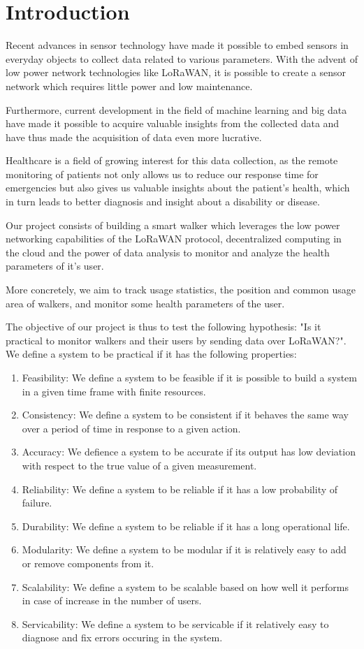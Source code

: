 \chapter{Introduction}
\label{cha:introduction}

Recent advances in sensor technology have made it possible to embed sensors in everyday objects to collect data related to various parameters. With the advent of low power network technologies like LoRaWAN, it is possible to create a sensor network which requires little power and low maintenance.

Furthermore, current development in the field of machine learning and big data have made it possible to acquire valuable insights from the collected data and have thus made the acquisition of data even more lucrative.

Healthcare is a field of growing interest for this data collection, as the remote monitoring of patients not only allows us to reduce our response time for emergencies but also gives us valuable insights about the patient's health, which in turn leads to better diagnosis and insight about a disability or disease.

Our project consists of building a smart walker which leverages the low power networking capabilities of the LoRaWAN protocol, decentralized computing in the cloud and the power of data analysis to monitor and analyze the health parameters of it's user.

More concretely, we aim to track usage statistics, the position and common usage area of walkers, and monitor some health parameters of the user.

The objective of our project is thus to test the following hypothesis:
"Is it practical to monitor walkers and their users by sending data over LoRaWAN?". We define a system to be practical if it has the following properties:

\begin{enumerate}
	\item Feasibility: We define a system to be feasible if it is possible to build a system in a given time frame with finite resources.
	\item Consistency: We define a system to be consistent if it behaves the same way over a period of time in response to a given action.
	\item Accuracy: We defience a system to be accurate if its output has low deviation with respect to the true value of a given measurement.
	\item Reliability: We define a system to be reliable if it has a low probability of failure.
	\item Durability: We define a system to be reliable if it has a long operational life.
	\item Modularity: We define a system to be modular if it is relatively easy to add or remove components from it.
	\item Scalability: We define a system to be scalable based on how well it performs in case of increase in the number of users.
	\item Servicability: We define a system to be servicable if it relatively easy to diagnose and fix errors occuring in the system.
\end{enumerate}


